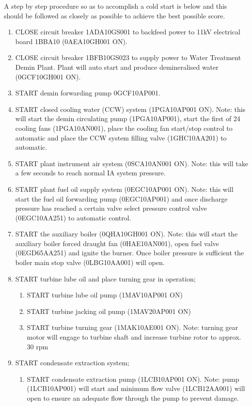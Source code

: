 \documentclass[10pt,a4paper]{article}
\begin{document}
A step by step procedure so as to accomplish a cold start is below and this should be followed as closely as possible to achieve the best possible score.
\begin{enumerate}
\item CLOSE circuit breaker 1ADA10GS001 to backfeed power to 11kV electrical board 1BBA10 (0AEA10GH001 ON).
\item CLOSE circuit breaker 1BFB10GS023 to supply power to Water Treatment Demin Plant. Plant will auto start and produce demineralised water (0GCF10GH001 ON).
\item START demin forwarding pump 0GCF10AP001.
\item START closed cooling water (CCW) system (1PGA10AP001 ON). Note: this will start the demin circulating pump (1PGA10AP001), start the first of 24 cooling fans (1PGA10AN001), place the cooling fan start/stop control to automatic and place the CCW system filling valve (1GHC10AA201) to automatic.
\item START plant instrument air system (0SCA10AN001 ON). Note: this will take a few seconds to reach normal IA system pressure.
\item START plant fuel oil supply system (0EGC10AP001 ON). Note: this will start the fuel oil forwarding pump (0EGC10AP001) and once discharge pressure has reached a certain valve select pressure control valve (0EGC10AA251) to automatic control.
\item START the auxiliary boiler (0QHA10GH001 ON). Note: this will start the auxiliary boiler forced draught fan (0HAE10AN001), open fuel valve (0EGD65AA251) and ignite the burner. Once boiler pressure is sufficient the boiler main stop valve (0LBG10AA001) will open.
\item START turbine lube oil and place turning gear in operation;
\begin{enumerate}
\item START turbine lube oil pump (1MAV10AP001 ON)
\item START turbine jacking oil pump (1MAV20AP001 ON)
\item START turbine turning gear (1MAK10AE001 ON). Note: turning gear motor will engage to turbine shaft and increase turbine rotor to approx. 30 rpm 
\end{enumerate}
\item START condensate extraction system;
\begin{enumerate}
\item START condensate extraction pump (1LCB10AP001 ON). Note: pump (1LCB10AP001) will start and minimum flow valve (1LCB12AA001) will open to ensure an adequate flow through the pump to prevent damage.

\end{enumerate}
\end{enumerate}
\end{document}
